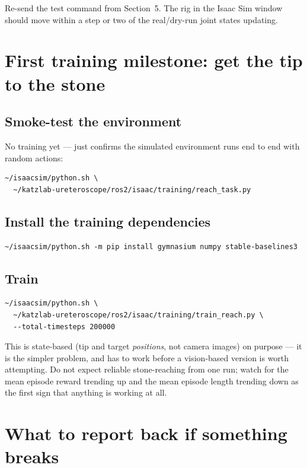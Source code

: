\documentclass[11pt]{article}
\begin{document}
Re-send the test command from Section~5. The rig in the Isaac Sim window
should move within a step or two of the real/dry-run joint states
updating.

\section{First training milestone: get the tip to the stone}

\subsection{Smoke-test the environment}
No training yet --- just confirms the simulated environment runs end to
end with random actions:

\begin{lstlisting}
~/isaacsim/python.sh \
  ~/katzlab-ureteroscope/ros2/isaac/training/reach_task.py
\end{lstlisting}

\subsection{Install the training dependencies}
\begin{lstlisting}
~/isaacsim/python.sh -m pip install gymnasium numpy stable-baselines3
\end{lstlisting}

\subsection{Train}
\begin{lstlisting}
~/isaacsim/python.sh \
  ~/katzlab-ureteroscope/ros2/isaac/training/train_reach.py \
  --total-timesteps 200000
\end{lstlisting}

This is state-based (tip and target \emph{positions}, not camera images)
on purpose --- it is the simpler problem, and has to work before a
vision-based version is worth attempting. Do not expect reliable
stone-reaching from one run; watch for the mean episode reward trending
up and the mean episode length trending down as the first sign that
anything is working at all.

\section{What to report back if something breaks}
\end{document}

